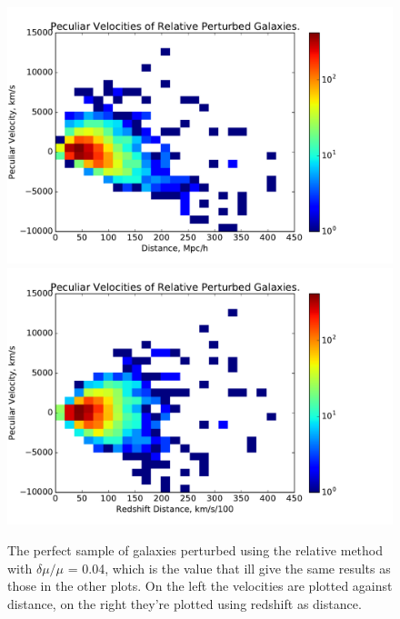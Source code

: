 \documentclass[usenatbib]{mn2e}
\begin{document}
\begin{figure}
\centering
\includegraphics[scale=0.35]{relative}
\hfill
\includegraphics[scale=0.35]{relativered}
\caption{\small The perfect sample of galaxies perturbed using the relative method with $\delta \mu/\mu$ = 0.04, which is the value that ill give the same results as those in the other plots. On the left the velocities are plotted against distance, on the right they're plotted using redshift as distance.}
\label{fig:relative}
\end{figure}
\end{document}
